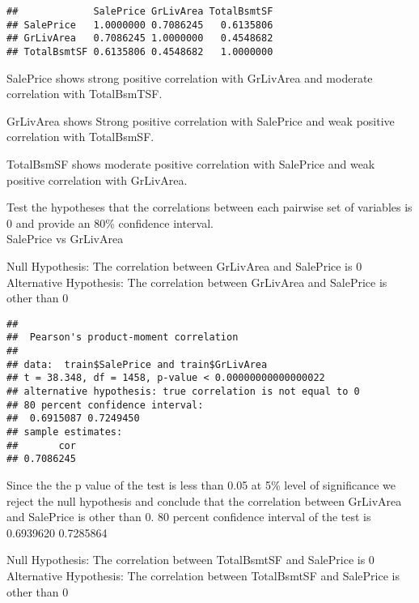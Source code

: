 \documentclass[]{article}
\newenvironment{Shaded}{\begin{snugshade}}{\end{snugshade}}
\newcommand{\DataTypeTok}[1]{\textcolor[rgb]{0.13,0.29,0.53}{#1}}
\newcommand{\FloatTok}[1]{\textcolor[rgb]{0.00,0.00,0.81}{#1}}
\newcommand{\KeywordTok}[1]{\textcolor[rgb]{0.13,0.29,0.53}{\textbf{#1}}}
\newcommand{\NormalTok}[1]{#1}
\newcommand{\OperatorTok}[1]{\textcolor[rgb]{0.81,0.36,0.00}{\textbf{#1}}}
\begin{document}
\begin{verbatim}
##             SalePrice GrLivArea TotalBsmtSF
## SalePrice   1.0000000 0.7086245   0.6135806
## GrLivArea   0.7086245 1.0000000   0.4548682
## TotalBsmtSF 0.6135806 0.4548682   1.0000000
\end{verbatim}

SalePrice shows strong positive correlation with GrLivArea and moderate
correlation with TotalBsmTSF.

GrLivArea shows Strong positive correlation with SalePrice and weak
positive correlation with TotalBsmSF.

TotalBsmSF shows moderate positive correlation with SalePrice and weak
positive correlation with GrLivArea.

Test the hypotheses that the correlations between each pairwise set of
variables is 0 and provide an 80\% confidence interval.\\
SalePrice vs GrLivArea

Null Hypothesis: The correlation between GrLivArea and SalePrice is 0
Alternative Hypothesis: The correlation between GrLivArea and SalePrice
is other than 0

\begin{Shaded}
\end{Shaded}

\begin{verbatim}
## 
##  Pearson's product-moment correlation
## 
## data:  train$SalePrice and train$GrLivArea
## t = 38.348, df = 1458, p-value < 0.00000000000000022
## alternative hypothesis: true correlation is not equal to 0
## 80 percent confidence interval:
##  0.6915087 0.7249450
## sample estimates:
##       cor 
## 0.7086245
\end{verbatim}

Since the the p value of the test is less than 0.05 at 5\% level of
significance we reject the null hypothesis and conclude that the
correlation between GrLivArea and SalePrice is other than 0. 80 percent
confidence interval of the test is 0.6939620 0.7285864

Null Hypothesis: The correlation between TotalBsmtSF and SalePrice is 0
Alternative Hypothesis: The correlation between TotalBsmtSF and
SalePrice is other than 0
\end{document}
